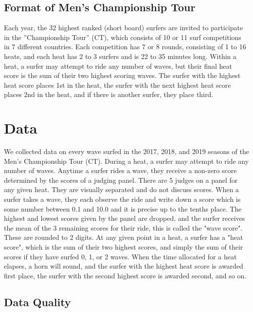 \documentclass{article}
\begin{document}
\subsection{Format of Men's Championship Tour}
Each year, the 32 highest ranked (short board) surfers are invited to participate in the ”Championship Tour” (CT), which consists of 10 or 11 surf competitions in 7 different countries. Each competition has 7 or 8 rounds, consisting of 1 to 16 heats, and each heat has 2 to 3 surfers and is 22 to 35 minutes long. Within a heat, a surfer may attempt to ride any number of waves, but their final heat score is the sum of their two highest scoring waves. The surfer with the highest heat score places 1st in the heat, the surfer with the next highest heat score places 2nd in the heat, and if there is another surfer, they place third.

\section{Data}
We collected data on every wave surfed in the 2017, 2018, and 2019 seasons of the Men's Championship Tour (CT). During a heat, a surfer may attempt to ride any number of waves. Anytime a surfer rides a wave, they receive a non-zero score determined by the scores of a judging panel. There are 5 judges on a panel for any given heat. They are visually separated and do not discuss scores. When a surfer takes a wave, they each observe the ride and write down a score which is some number between 0.1 and 10.0 and it is precise up to the tenths place. The highest and lowest scores given by the panel are dropped, and the surfer receives the mean of the 3 remaining scores for their ride, this is called the "wave score". These are rounded to 2 digits. At any given point in a heat, a surfer has a "heat score", which is the sum of their two highest scores, and simply the sum of their scores if they have surfed 0, 1, or 2 waves. When the time allocated for a heat elapses, a horn will sound, and the surfer with the highest heat score is awarded first place, the surfer with the second highest score is awarded second, and so on.

\subsection{Data Quality}
\end{document}
